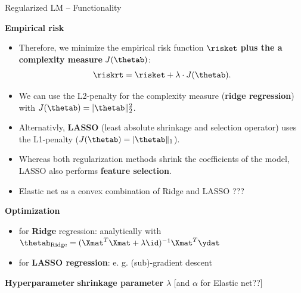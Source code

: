 \documentclass[11pt,compress,t,notes=noshow, xcolor=table]{beamer}
\newcommand{\highlight}[1]{\textcolor{highlightcol}{\textbf{#1}}}
\begin{document}
\begin{frame}{Regularized LM -- Functionality}

\footnotesize

\highlight{Empirical risk}

\begin{itemize}

\item Therefore, we minimize the empirical risk function $\risket$ \textbf{plus the a complexity measure} $J(\thetab)$:
  $$
  \riskrt = \risket + \lambda \cdot J(\thetab). 
  $$ 
  
\item We can use the L2-penalty for the complexity measure (\textbf{ridge regression}) with $J(\thetab) = |\thetab\|_2^2 $. 

\item Alternativly, \textbf{LASSO} (least absolute shrinkage and selection operator) uses the L1-penalty ($J(\thetab) = |\thetab\|_1 $).

\item Whereas both regularization methods shrink the coefficients of the model, LASSO also performs \textbf{feature selection}. 

\item Elastic net as a convex combination of Ridge and LASSO ???
  
  
\end{itemize}





\medskip

\highlight{Optimization} ~~
\begin{itemize}\footnotesize
  \item for \textbf{Ridge} regression: analytically with $\thetah_{\text{Ridge}} = (\Xmat^T \Xmat  + \lambda \id)^{-1} \Xmat^T\ydat$
  \item for \textbf{LASSO regression}: e. g. (sub)-gradient descent
\end{itemize}

\medskip

\highlight{Hyperparameter} \textbf{shrinkage parameter} $\lambda$ [and $\alpha$ for Elastic net??]

\end{frame}

\end{document}
